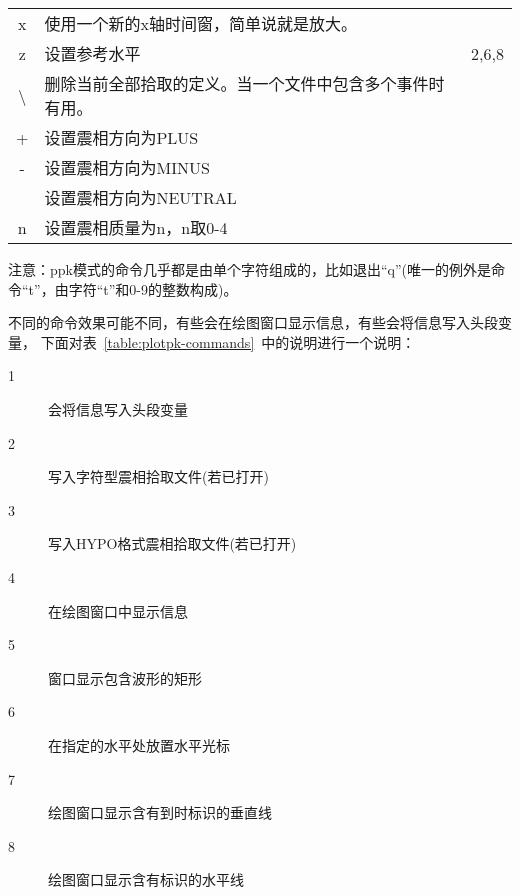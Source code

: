 \begin{table}[H]
\begin{tabular}{cll}
    x	    &	使用一个新的x轴时间窗，简单说就是放大。 &           \\
    z	    &	设置参考水平                            &   2,6,8	\\
    \textbackslash	    &	删除当前全部拾取的定义。当一个文件中包含多个事件时有用。&	\\
    +	    &	设置震相方向为PLUS	                    &           \\
    -	    &	设置震相方向为MINUS	                    &           \\
    \lstinline[showspaces]! !   &	设置震相方向为NEUTRAL	                &           \\
    n	    &	设置震相质量为n，n取0-4	                &           \\
	\bottomrule
\end{tabular}
\end{table}
注意：ppk模式的命令几乎都是由单个字符组成的，比如退出``q''(唯一的例外是命令``t''，由字符``t''和0-9的整数构成)。

不同的命令效果可能不同，有些会在绘图窗口显示信息，有些会将信息写入头段变量，
下面对表~\ref{table:plotpk-commands}~中的说明进行一个说明：
\begin{description}
    \item [1] 会将信息写入头段变量
    \item [2] 写入字符型震相拾取文件(若已打开)
    \item [3] 写入HYPO格式震相拾取文件(若已打开)
    \item [4] 在绘图窗口中显示信息
    \item [5] 窗口显示包含波形的矩形
    \item [6] 在指定的水平处放置水平光标
    \item [7] 绘图窗口显示含有到时标识的垂直线
    \item [8] 绘图窗口显示含有标识的水平线
\end{description}

